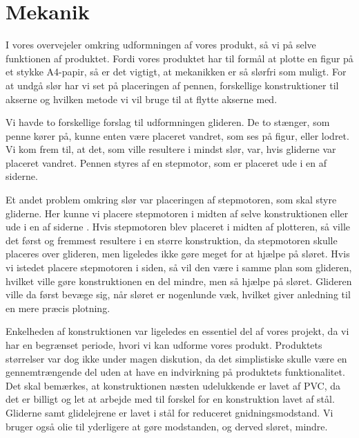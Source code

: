 \chapter[Design af mekanik]{Mekanik}


I vores overvejeler omkring udformningen af vores produkt, så vi på
selve funktionen af produktet. Fordi vores produktet har til formål at
plotte en figur på et stykke A4-papir, så er det vigtigt, at
mekanikken er så slørfri som muligt. For at undgå slør har vi set på
placeringen af pennen, forskellige konstruktioner til akserne og
hvilken metode vi vil bruge til at flytte akserne med.

Vi havde to forskellige forslag til udformningen glideren. De to
stænger, som penne kører på, kunne enten være placeret vandret, som
ses på figur, eller lodret. Vi kom frem
til, at det, som ville resultere i mindst slør, var, hvis gliderne var
placeret vandret. Pennen styres af en stepmotor, som er placeret ude i
en af siderne.

Et andet problem omkring slør var placeringen af stepmotoren, som skal
styre gliderne. Her kunne vi placere stepmotoren i midten af selve
konstruktionen eller ude i en af siderne . Hvis
stepmotoren blev placeret i midten af plotteren, så ville det først og
fremmest resultere i en større konstruktion, da stepmotoren skulle
placeres over glideren, men ligeledes ikke gøre meget for at hjælpe på
sløret. Hvis vi istedet placere stepmotoren i siden, så vil den være i
samme plan som glideren, hvilket ville gøre konstruktionen en del
mindre, men så hjælpe på sløret. Glideren ville da først bevæge sig,
når sløret er nogenlunde væk, hvilket giver anledning til en mere
præcis plotning.

Enkelheden af konstruktionen var ligeledes en essentiel del af vores
projekt, da vi har en begrænset periode, hvori vi kan udforme vores
produkt. Produktets størrelser var dog ikke under magen diskution, da
det simplistiske skulle være en gennemtrængende del uden at have en
indvirkning på produktets funktionalitet. Det skal bemærkes, at
konstruktionen næsten udelukkende er lavet af PVC, da det er billigt
og let at arbejde med til forskel for en konstruktion lavet af
stål. Gliderne samt glidelejrene er lavet i stål for reduceret
gnidningsmodstand. Vi bruger også olie til yderligere at gøre
modstanden, og derved sløret, mindre.


